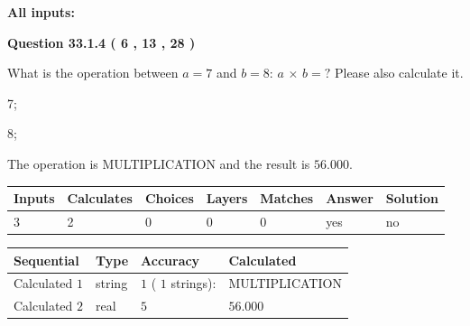 \documentclass[12pt]{article}
\begin{document}
   
   
   
\noindent{}
   
   
   
   
\noindent\vspace{0.1in}\hspace{-0.08in} {\textbf{\Large{All inputs: }}}
   
   
  
\vspace{0.2in}
  
{\textbf{\Large{Question
33.1.4 
 (           6 ,          13 ,          28 )
}}}
  
  
What is the operation between $a= %
7$ and $b= %
8$:
$a$  %
$\times$ $b=?$ Please also calculate it.
 
 
\noindent{}
 
 

7;
 
8;
 
The operation is  %
MULTIPLICATION and the result is
$ %
56.000$.
 
 
 
\noindent{}
 
 

 
\vspace{0.3in}
   
   
   
   
\noindent\begin{tabular}{|l|l|l|l|l|l|l|}
 \hline
Inputs & Calculates & Choices & Layers & Matches & Answer & Solution \\ \hline
           3  & 
           2  & 
           0
  & 
           0  & 
           0  & 
  yes & 
  no 
  \\ \hline
 \end{tabular}
   
   
   
   
\noindent{}
   
   
  
  
\noindent\begin{tabular}{|l|l|l|l|}
\hline
 Sequential & Type & Accuracy & Calculated \\ 
\hline
 
 
  Calculated $            1 $ & string & $            1  $ ( $           1  $ strings): 
 & MULTIPLICATION
 \\  \hline  
 
 
  Calculated $            2 $ & real & $            5  $ & 
 $ 56.000 $ 
 \\  \hline  
 \end{tabular}
   
\end{document}
